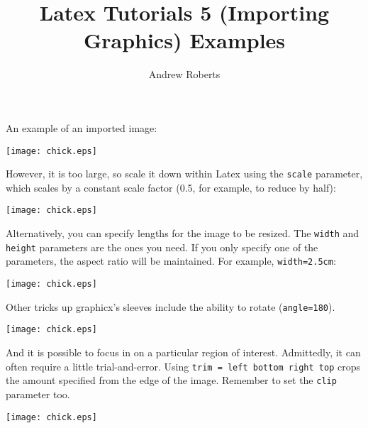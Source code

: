 \documentclass[english]{article}
\begin{document}
\title{Latex Tutorials 5 (Importing Graphics) Examples}
\author{Andrew Roberts}
\maketitle

An example of an imported image:

\begin{center}
  \texttt{[image: chick.eps]}
\end{center}

However, it is too large, so scale it down within Latex using the
\texttt{scale} parameter, which scales by a constant
scale factor (0.5, for example, to reduce by half):

\begin{center}
  \texttt{[image: chick.eps]}
\end{center}

Alternatively, you can specify lengths for the image to be resized.  The
\texttt{width} and \texttt{height} parameters are the ones you need.  If
you only specify one of the parameters, the aspect ratio will be
maintained.  For example, \texttt{width=2.5cm}:
\begin{center}
  \texttt{[image: chick.eps]}
\end{center}

Other tricks up graphicx's sleeves include the ability to rotate
(\texttt{angle=180}).

\begin{center}
  \texttt{[image: chick.eps]}
\end{center}

And it is possible to focus in on a particular region of interest.
Admittedly, it can often require a little trial-and-error. Using
\texttt{trim = left bottom right top} crops the amount specified from
the edge of the image.  Remember to set the \texttt{clip} parameter too.

\begin{center}
  \texttt{[image: chick.eps]}
\end{center}
\end{document}
